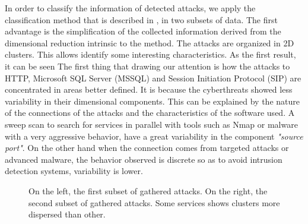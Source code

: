 \documentclass[a4paper]{llncs}
\begin{document}
In order to classify the information of detected attacks, we apply the classification method that is described in \cite{panda-2009}, in two subsets of data. The first advantage is the simplification of the collected information derived from the dimensional reduction intrinsic to the method. The attacks are organized in 2D clusters.  This allows identify some interesting characteristics. As the first result, it can be seen The first thing that drawing our attention is how the attacks to HTTP, Microsoft SQL Server (MSSQL) and Session Initiation Protocol (SIP) are concentrated in areas better defined. It is because the cyberthreats showed less variability in their dimensional components. This can be explained by the nature of the connections of the attacks and the characteristics of the software used. A sweep scan to search for services in parallel with tools such as Nmap\cite{nmap} or malware with a very aggressive behavior, have a great variability in the component {\it"source port"}. On the other hand when the connection comes from targeted attacks or advanced malware, the behavior observed is discrete so as to avoid intrusion detection systems, variability is lower.

\begin{figure}[h]
	\label{fig:intvsextDionaea}
	\label{fig:intvsextKippo}
	\caption{On the left, the first subset of gathered attacks. On the right, the second subset of gathered attacks. Some services shows clusters more dispersed than other.}
\end{figure}
\end{document}

